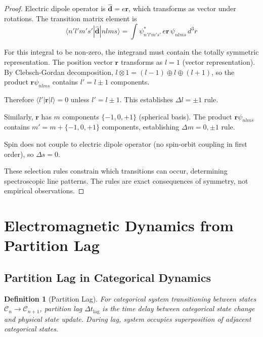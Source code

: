 \documentclass[twocolumn,10pt]{article}
\newtheorem{definition}{Definition}[section]
\begin{document}
\begin{proof}
Electric dipole operator is $\hat{\mathbf{d}} = e\mathbf{r}$, which transforms as vector under rotations. The transition matrix element is
\begin{equation}
\langle n'l'm's' | \hat{\mathbf{d}} | nlms \rangle = \int \psi_{n'l'm's'}^* \, e\mathbf{r} \, \psi_{nlms} \, d^3r
\end{equation}

For this integral to be non-zero, the integrand must contain the totally symmetric representation. The position vector $\mathbf{r}$ transforms as $l=1$ (vector representation). By Clebsch-Gordan decomposition, $l \otimes 1 = (l-1) \oplus l \oplus (l+1)$, so the product $\mathbf{r} \psi_{nlms}$ contains $l' = l \pm 1$ components.

Therefore $\langle l' | \mathbf{r} | l \rangle = 0$ unless $l' = l \pm 1$. This establishes $\Delta l = \pm 1$ rule.

Similarly, $\mathbf{r}$ has $m$ components $\{-1, 0, +1\}$ (spherical basis). The product $\mathbf{r} \psi_{nlms}$ contains $m' = m + \{-1, 0, +1\}$ components, establishing $\Delta m = 0, \pm 1$ rule.

Spin does not couple to electric dipole operator (no spin-orbit coupling in first order), so $\Delta s = 0$.

These selection rules constrain which transitions can occur, determining spectroscopic line patterns. The rules are exact consequences of symmetry, not empirical observations.
\end{proof}

\section{Electromagnetic Dynamics from Partition Lag}

\subsection{Partition Lag in Categorical Dynamics}

\begin{definition}[Partition Lag]
For categorical system transitioning between states $\mathcal{C}_n \to \mathcal{C}_{n+1}$, partition lag $\Delta t_{\text{lag}}$ is the time delay between categorical state change and physical state update. During lag, system occupies superposition of adjacent categorical states.
\end{definition}
\end{document}
